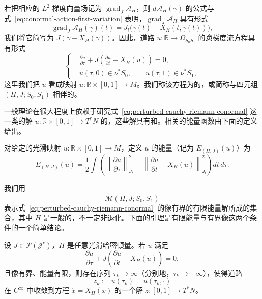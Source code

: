 若把相应的 $L^2$-梯度向量场记为 $\operatorname{grad}_J\mathcal A_H$，则 $d\mathcal A_H(\gamma)$ 的公式与式~\eqref{eq:conormal-action-first-variation} 表明，$\operatorname{grad}_J\mathcal A_H$ 具有形式
\begin{equation}
  \operatorname{grad}_J\mathcal A_H(\gamma)(t)
  =J_t\bigl(\dot\gamma(t)-X_H(t,\gamma(t))\bigr),
  \label{eq:action-l2-gradient}
\end{equation}
我们将它简写为 $J(\dot\gamma-X_H(\gamma))$。因此，道路 $u:\mathbb R\to\Omega_{S_0S_1}$ 的\emph{负}梯度流方程具有形式
\begin{equation}
\left\{
\begin{aligned}
  &\frac{\partial u}{\partial\tau}
    +J\left(\frac{\partial u}{\partial t}-X_H(u)\right)=0,\\
  &u(\tau,0)\in\nu^*S_0,
    \qquad u(\tau,1)\in\nu^*S_1,
\end{aligned}
\right.
\label{eq:perturbed-cauchy-riemann-conormal}
\end{equation}
这里我们把 $u$ 看成映射 $u:\mathbb R\times[0,1]\to M$。我们称该方程为\personFloer{}的\emph{\termPerturbedCauchyRiemannEquation{}}，或简称与四元组 $(H,J;S_0,S_1)$ 相伴的\termPerturbedCauchyRiemannEquation{}。

一般\personFloer{}理论在很大程度上依赖于研究式~\eqref{eq:perturbed-cauchy-riemann-conormal} 这一类\termPerturbedCauchyRiemannEquation{}的解 $u:\mathbb R\times[0,1]\to T^*N$ 的\termModuliSpace{}，这些解具有\emph{\termFiniteEnergy{}}和\emph{\termBoundedImage{}}。相关的能量函数由下面的定义给出。

\begin{definition}
\label{def:floer-energy}
对给定的光滑映射 $u:\mathbb R\times[0,1]\to M$，定义 $u$ 的能量（记为 $E_{(H,J)}(u)$）为
\[
  E_{(H,J)}(u)
  =\frac12\int\left(
      \left\lVert\frac{\partial u}{\partial\tau}\right\rVert_{J_t}^2
      +\left\lVert\frac{\partial u}{\partial t}-X_H(u)\right\rVert_{J_t}^2
    \right)dt\,d\tau.
\]
\end{definition}

我们用
\[
  \widetilde{\mathcal M}(H,J;S_0,S_1)
\]
表示式~\eqref{eq:perturbed-cauchy-riemann-conormal} 的像有界的有限能量解所成的集合，其中 $H$ 是一般的，不一定非退化。下面的引理是有限能量与有界像这两个条件的一个简单结论。

\begin{lemma}
\label{lem:finite-energy-subsequence-convergence}
设 $J\in\mathcal P(\mathcal J^c)$，$H$ 是任意光滑哈密顿量。若 $u$ 满足
\[
  \frac{\partial u}{\partial\tau}
  +J\left(\frac{\partial u}{\partial t}-X_H(u)\right)=0,
\]
且像有界、能量有限，则存在序列 $\tau_k\to\infty$（分别地，$\tau_k\to-\infty$），使得道路
\[
  z_k:=u(\tau_k)=u(\tau_k,\mathord\cdot)
\]
在 $C^\infty$ 中收敛到\personHamilton{}方程 $\dot x=X_H(x)$ 的一个解 $z:[0,1]\to T^*N$。
\end{lemma}

